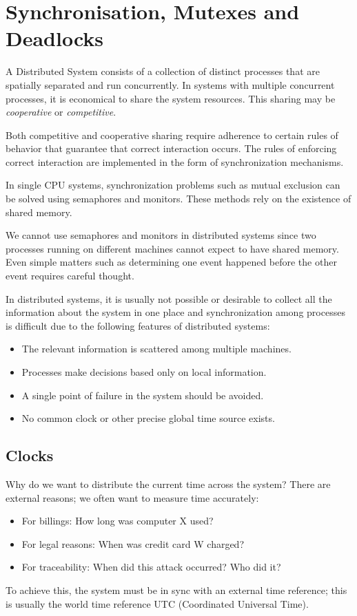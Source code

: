 \chapter{Synchronisation, Mutexes and Deadlocks}

A Distributed System consists of a collection of distinct processes 
that are spatially separated and run concurrently. In systems with multiple concurrent processes, it is economical to share the system resources. This sharing may be \textit{cooperative} or \textit{competitive}.

Both competitive and cooperative sharing require adherence to 
certain rules of behavior that guarantee that correct interaction 
occurs. The rules of enforcing correct interaction are implemented in the 
form of synchronization mechanisms. 

In single CPU systems, synchronization problems such as mutual exclusion can be solved using semaphores and monitors. These methods rely on the existence of shared memory.

We cannot use semaphores and monitors in distributed systems since two processes running on different machines cannot expect to have shared memory. Even simple matters such as determining one event happened before the other event requires careful thought.

In distributed systems, it is usually not possible or desirable to collect all the information about the system in one place and synchronization among processes is difficult due to the following 
features of distributed systems:

\begin{itemize}
\item The relevant information is scattered among multiple machines.
\item Processes make decisions based only on local information.
\item A single point of failure in the system should be avoided.
\item No common clock or other precise global time source exists. 
\end{itemize}

\section{Clocks}
Why do we want to distribute the current time across the system? There are external reasons; we often want to measure time accurately:
\begin{itemize}
\item For billings: How long was computer X used? 
\item For legal reasons: When was credit card W charged? 
\item For traceability: When did this attack occurred? Who did it? 
\end{itemize}
To achieve this, the system must be in sync with an external time reference; this is usually the world time reference UTC (Coordinated Universal Time).

